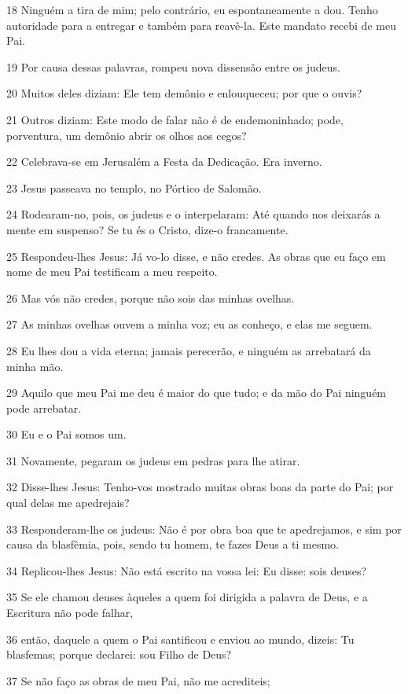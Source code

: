 \par 18 Ninguém a tira de mim; pelo contrário, eu espontaneamente a dou. Tenho autoridade para a entregar e também para reavê-la. Este mandato recebi de meu Pai.
\par 19 Por causa dessas palavras, rompeu nova dissensão entre os judeus.
\par 20 Muitos deles diziam: Ele tem demônio e enlouqueceu; por que o ouvis?
\par 21 Outros diziam: Este modo de falar não é de endemoninhado; pode, porventura, um demônio abrir os olhos aos cegos?
\par 22 Celebrava-se em Jerusalém a Festa da Dedicação. Era inverno.
\par 23 Jesus passeava no templo, no Pórtico de Salomão.
\par 24 Rodearam-no, pois, os judeus e o interpelaram: Até quando nos deixarás a mente em suspenso? Se tu és o Cristo, dize-o francamente.
\par 25 Respondeu-lhes Jesus: Já vo-lo disse, e não credes. As obras que eu faço em nome de meu Pai testificam a meu respeito.
\par 26 Mas vós não credes, porque não sois das minhas ovelhas.
\par 27 As minhas ovelhas ouvem a minha voz; eu as conheço, e elas me seguem.
\par 28 Eu lhes dou a vida eterna; jamais perecerão, e ninguém as arrebatará da minha mão.
\par 29 Aquilo que meu Pai me deu é maior do que tudo; e da mão do Pai ninguém pode arrebatar.
\par 30 Eu e o Pai somos um.
\par 31 Novamente, pegaram os judeus em pedras para lhe atirar.
\par 32 Disse-lhes Jesus: Tenho-vos mostrado muitas obras boas da parte do Pai; por qual delas me apedrejais?
\par 33 Responderam-lhe os judeus: Não é por obra boa que te apedrejamos, e sim por causa da blasfêmia, pois, sendo tu homem, te fazes Deus a ti mesmo.
\par 34 Replicou-lhes Jesus: Não está escrito na vossa lei: Eu disse: sois deuses?
\par 35 Se ele chamou deuses àqueles a quem foi dirigida a palavra de Deus, e a Escritura não pode falhar,
\par 36 então, daquele a quem o Pai santificou e enviou ao mundo, dizeis: Tu blasfemas; porque declarei: sou Filho de Deus?
\par 37 Se não faço as obras de meu Pai, não me acrediteis;
